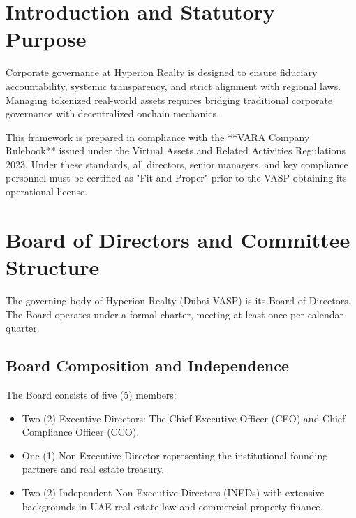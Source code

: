 \documentclass[11pt]{article}
\begin{document}

\newpage
{}
\tableofcontents
\newpage

\setcounter{page}{1}

\section{Introduction and Statutory Purpose}
Corporate governance at Hyperion Realty is designed to ensure fiduciary accountability, systemic transparency, and strict alignment with regional laws. Managing tokenized real-world assets requires bridging traditional corporate governance with decentralized onchain mechanics.

This framework is prepared in compliance with the **VARA Company Rulebook** issued under the Virtual Assets and Related Activities Regulations 2023. Under these standards, all directors, senior managers, and key compliance personnel must be certified as "Fit and Proper" prior to the VASP obtaining its operational license.

\section{Board of Directors and Committee Structure}
The governing body of Hyperion Realty (Dubai VASP) is its Board of Directors. The Board operates under a formal charter, meeting at least once per calendar quarter.

\subsection{Board Composition and Independence}
The Board consists of five (5) members:
\begin{itemize}
    \item Two (2) Executive Directors: The Chief Executive Officer (CEO) and Chief Compliance Officer (CCO).
    \item One (1) Non-Executive Director representing the institutional founding partners and real estate treasury.
    \item Two (2) Independent Non-Executive Directors (INEDs) with extensive backgrounds in UAE real estate law and commercial property finance.
\end{itemize}
\end{document}
